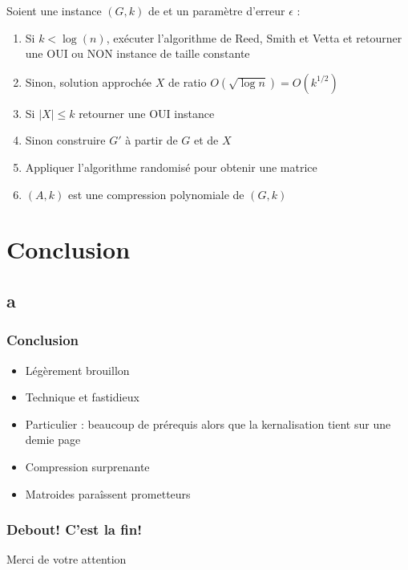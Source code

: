 \documentclass[9pt]{beamer}
\begin{document}
\begin{frame}
    Soient une instance $(G, k)$ de \oct et un paramètre d'erreur $\epsilon$ :
    \vfill
    \begin{enumerate}
        \item Si $k < \log(n)$, exécuter l'algorithme de Reed, Smith et Vetta et retourner une OUI
            ou NON instance de taille constante
            \pause
        \item Sinon, solution approchée $X$ de ratio $O(\sqrt{\log n}) = O(k^{1/2})$
            \pause
        \item Si $|X| \leq k$ retourner une OUI instance
            \pause
        \item Sinon construire $G'$ à partir de $G$ et de $X$
            \pause
        \item Appliquer l'algorithme randomisé pour obtenir une matrice
            \pause
        \item $(A, k)$ est une compression polynomiale de $(G, k)$
    \end{enumerate}
\end{frame}

\section{Conclusion}
\subsection*{a}

\begin{frame}
    \frametitle{Conclusion}
    \vfill
    \begin{itemize}
        \item Légèrement brouillon
            \vfill
        \item Technique et fastidieux
            \vfill
        \item Particulier : beaucoup de prérequis alors que la kernalisation tient sur une demie
            page
            \vfill
        \item Compression surprenante
            \vfill
        \item Matroides paraîssent prometteurs
    \end{itemize}
    \vfill
\end{frame}

\begin{frame}
    \frametitle{Debout! C'est la fin!}
    \vfill
    \begin{center}
        Merci de votre attention
    \end{center}
    \vfill
\end{frame}
\end{document}
